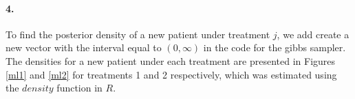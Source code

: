 \documentclass[12pt, leqno]{article}
\begin{document}
\paragraph{4.}

To find the posterior density of a new patient under treatment $j$, we
add create a new vector with the interval equal to $(0, \infty)$ in
the code for the gibbs sampler. The densities for a new patient under each treatment are
presented in Figures \ref{ml1} and \ref{ml2} for treatments 1 and 2
respectively, which was estimated using the $density$ function in
$R$.

\begin{figure}
\centering
{}
\centering
\qquad
\centering
{}
\end{figure}
\end{document}
